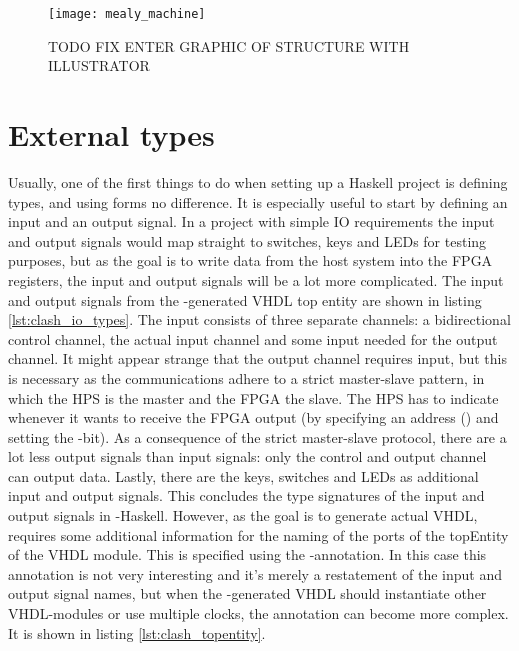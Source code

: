 \begin{figure}[h]
	\centering
	\texttt{[image: mealy\_machine]}
	\caption{TODO FIX ENTER GRAPHIC OF STRUCTURE WITH ILLUSTRATOR}
	\label{f:large_structure}
\end{figure}

\section{External types}
Usually, one of the first things to do when setting up a Haskell project is defining types, and using \clash{} forms no difference. It is especially useful to start by defining an input and an output signal. In a project with simple IO requirements the input and output signals would map straight to switches, keys and LEDs for testing purposes, but as the goal is to write data from the host system into the FPGA registers, the input and output signals will be a lot more complicated. The input and output signals from the \clash{}-generated VHDL top entity are shown in listing \ref{lst:clash_io_types}. The input consists of three separate channels: a bidirectional control channel, the actual input channel and some input needed for the output channel. It might appear strange that the output channel requires input, but this is necessary as the communications adhere to a strict master-slave pattern, in which the HPS is the master and the FPGA the slave. The HPS has to indicate whenever it wants to receive the FPGA output (by specifying an address () and setting the -bit). As a consequence of the strict master-slave protocol, there are a lot less output signals than input signals: only the control and output channel can output data. Lastly, there are the keys, switches and LEDs as additional input and output signals. This concludes the type signatures of the input and output signals in \clash{}-Haskell. However, as the goal is to generate actual VHDL, \clash{} requires some additional information for the naming of the ports of the topEntity of the VHDL module. This is specified using the -annotation. In this case this annotation is not very interesting and it's merely a restatement of the input and output signal names, but when the \clash{}-generated VHDL should instantiate other VHDL-modules or use multiple clocks, the annotation can become more complex. It is shown in listing \ref{lst:clash_topentity}. 




